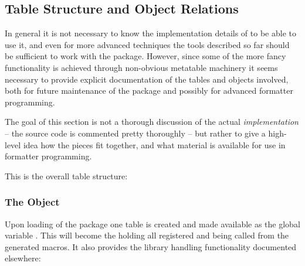 \documentclass[12pt]{scrartcl}
\begin{document}
\subsection{Table Structure and Object Relations}
\label{sec:advanced:tables-and-objects}

In general it is not necessary to know the implementation details of
 to be able to use it, and even for more advanced
techniques the tools described so far should be sufficient to work with the
package.  However, since some of the more fancy functionality is achieved
through non-obvious metatable machinery it seems necessary to provide explicit
documentation of the tables and objects involved, both for future maintenance of
the package and possibly for advanced formatter programming.

The goal of this section is not a thorough discussion of the actual
\emph{implementation} -- the source code is commented pretty thoroughly -- but
rather to give a high-level idea how the pieces fit together, and what material
is available for use in formatter programming.

This is the overall table structure:

\medskip


\bigskip


\bigskip



\subsubsection{The  Object}
\label{sec:advanced:the-lua-templates-object}

Upon loading of the  package one  table
is created and made available as the global variable .
This will become the  holding all registered
 and being called from the generated macros.  It also
provides the library handling functionality documented elsewhere:
\end{document}

